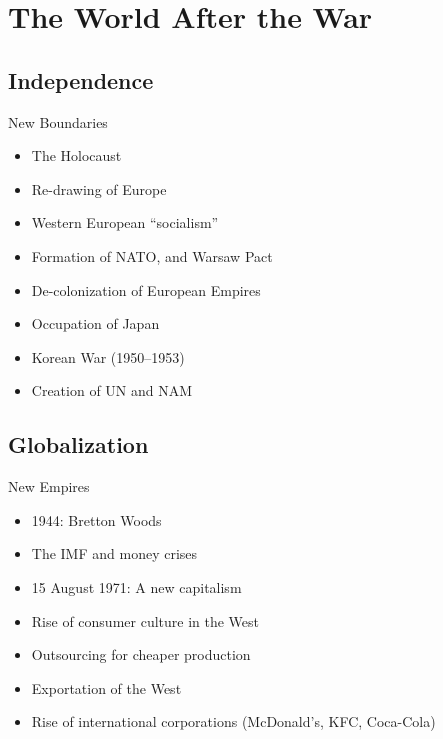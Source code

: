 


\section{The World After the War}
\subsection{Independence}
\begin{frame}{New Boundaries}

	\begin{itemize}
		\item<1-2,4-5,7-10>The Holocaust
		\item<2,4-5,7-10>Re-drawing of Europe
		\item<4-5,7-10>Western European ``socialism''
		\item<5,7-10>Formation of NATO, and Warsaw Pact
		\item<7-10>De-colonization of European Empires
		\item<8-10>Occupation of Japan
		\item<9-10>Korean War (1950--1953)
		\item<10>Creation of UN and NAM
	\end{itemize}
\end{frame}

\subsection{Globalization}
\begin{frame}{New Empires}
	\begin{itemize}
		\item<1-7>1944: Bretton Woods
		\item<2-7>The IMF and money crises
		\item<3-7>15 August 1971: A new capitalism
		\item<4-7>Rise of consumer culture in the West
		\item<5-7>Outsourcing for cheaper production
		\item<6-7>Exportation of the West
		\item<7>Rise of international corporations (McDonald's, KFC, Coca-Cola)
	\end{itemize}
\end{frame}

